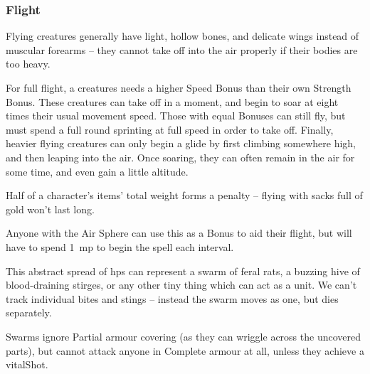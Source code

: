 \begin{multicols}{2}
\subsubsection{Flight}

Flying creatures generally have light, hollow bones, and delicate wings instead of muscular forearms -- they cannot take off into the air properly if their bodies are too heavy.

For full flight, a creatures needs a higher Speed Bonus than their own Strength Bonus.
These creatures can take off in a moment, and begin to soar at eight times their usual movement speed.
Those with equal Bonuses can still fly, but must spend a full round sprinting at full speed in order to take off.
Finally, heavier flying creatures can only begin a glide by first climbing somewhere high, and then leaping into the air.
Once soaring, they can often remain in the air for some time, and even gain a little altitude.

Half of a character's items' total \gls{weight} forms a penalty -- flying with sacks full of gold won't last long.

Anyone with the Air Sphere can use this as a Bonus to aid their flight, but will have to spend 1~\gls{mp} to begin the spell each \gls{interval}.



This abstract spread of \glspl{hp} can represent a swarm of feral rats, a buzzing hive of blood-draining stirges, or any other tiny thing which can act as a unit.
We can't track individual bites and stings -- instead the swarm moves as one, but dies separately.

Swarms ignore Partial armour covering (as they can wriggle across the uncovered parts), but cannot attack anyone in Complete armour at all, unless they achieve a \gls{vitalShot}.




\end{multicols}
